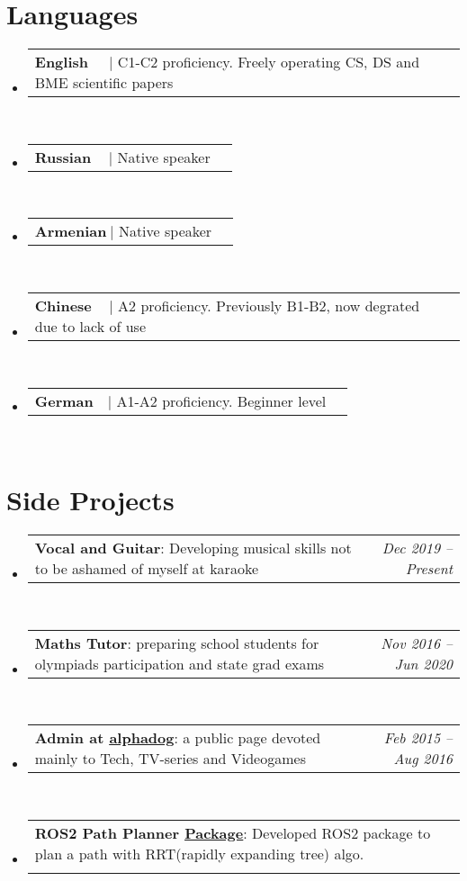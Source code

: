 \documentclass[a4paper,11pt]{article}
\makeatletter
\newcommand{\resumeProjectHeading}[2]{
    \item
    \begin{tabular*}{0.97\textwidth}{l@{\extracolsep{\fill}}r}
      \small#1 & #2 \\
    \end{tabular*}\vspace{-7pt}
}
\newcommand{\resumeSubHeadingListStart}{\begin{itemize}[leftmargin=0.15in, label={}]}
\newcommand{\resumeSubHeadingListEnd}{\end{itemize}}
\makeatother
\begin{document}
\section{Languages}
\resumeSubHeadingListStart      
\resumeProjectHeading
    {\textbf{English} $\> \> \> \> \>  |$ {C1-C2 proficiency. Freely operating CS, DS and BME scientific papers}}{}\\
\resumeProjectHeading
    {\textbf{Russian} $\> \> \> \> |$ {Native speaker}}{}\\
\resumeProjectHeading
    {\textbf{Armenian}$\> |$ {Native speaker}}{}\\
\resumeProjectHeading
    {\textbf{Chinese} $\> \> \> \> |$ {A2 proficiency. Previously B1-B2, now degrated due to lack of use}}{}\\
\resumeProjectHeading
    {\textbf{German}  $\> \> \> |$ {A1-A2 proficiency. Beginner level}}{}\\
\resumeSubHeadingListEnd

\section{Side Projects}
\resumeSubHeadingListStart
      
      \resumeProjectHeading
      {\textbf{Vocal and Guitar}{: Developing musical skills not to be ashamed of myself at karaoke}}{\emph{Dec 2019 -- Present}} \\
      
      \resumeProjectHeading
      {\textbf{Maths Tutor}{: preparing school students for olympiads participation and state grad exams}}{\emph{Nov 2016 -- Jun 2020}} \\
      
      \resumeProjectHeading
      {\textbf{Admin at \href{https://vk.com/alpha_dogs}{\underline{alphadog}}}{: a public page devoted mainly to Tech, TV-series and Videogames}}{\emph{Feb 2015 -- Aug 2016}} \\
      
      \resumeProjectHeading
      {\textbf{ROS2 Path Planner \href{https://github.com/aaptss/route_planning_ros2}{\underline{Package}}}{: Developed ROS2 package to plan a path with RRT(rapidly expanding tree) algo. }}\\

\resumeSubHeadingListEnd

\end{document}
